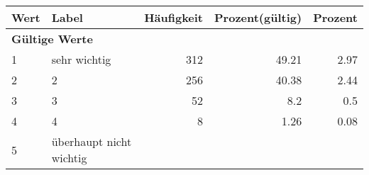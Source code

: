      \begin{longtable}{lXrrr}
     \toprule
     \textbf{Wert} & \textbf{Label} & \textbf{Häufigkeit} & \textbf{Prozent(gültig)} & \textbf{Prozent} \\
     \endhead
     \midrule
     \multicolumn{5}{l}{\textbf{Gültige Werte}}\\

     1 &
     \multicolumn{1}{X}{ sehr wichtig   } &


       \num{312} &
       \num[round-mode=places,round-precision=2]{49.21} &
         \num[round-mode=places,round-precision=2]{2.97} \\

     2 &
     \multicolumn{1}{X}{ 2   } &


       \num{256} &
       \num[round-mode=places,round-precision=2]{40.38} &
         \num[round-mode=places,round-precision=2]{2.44} \\

     3 &
     \multicolumn{1}{X}{ 3   } &


       \num{52} &
       \num[round-mode=places,round-precision=2]{8.2} &
         \num[round-mode=places,round-precision=2]{0.5} \\

     4 &
     \multicolumn{1}{X}{ 4   } &


       \num{8} &
       \num[round-mode=places,round-precision=2]{1.26} &
         \num[round-mode=places,round-precision=2]{0.08} \\

     5 &
     \multicolumn{1}{X}{ überhaupt nicht wichtig   } &



\end{longtable}
